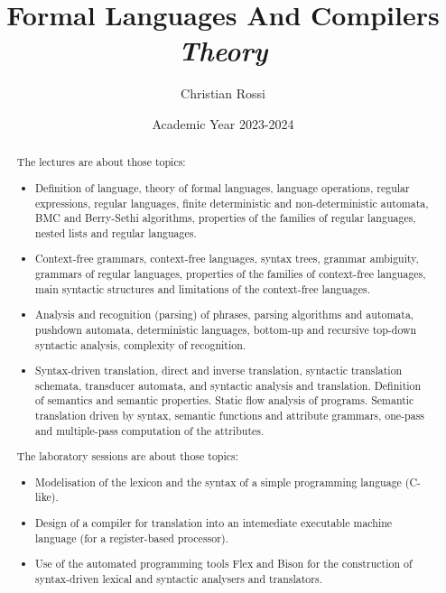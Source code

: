 \documentclass[12pt, a4paper]{report}
\title{Formal Languages And Compilers \\ \textit{Theory}}
\author{Christian Rossi}
\date{Academic Year 2023-2024}
\newtheorem[style=M,bodystyle=\normalfont]{theorem}{Theorem}
\newtheorem[style=M,bodystyle=\normalfont]{corollary}{Corollary}
\newtheorem[style=M,bodystyle=\normalfont]{lemma}{Lemma}
\newtheorem[style=M,bodystyle=\normalfont]{definition}{Definition}
\begin{document}
\maketitle

\newpage

\begin{abstract}
    The lectures are about those topics: 
    \begin{itemize}
        \item Definition of language, theory of formal languages, language operations, regular expressions, regular languages, finite deterministic and non-deterministic automata, 
            BMC and Berry-Sethi algorithms, properties of the families of regular languages, nested lists and regular languages.
        \item Context-free grammars, context-free languages, syntax trees, grammar ambiguity, grammars of regular languages, properties of the families of context-free languages, 
            main syntactic structures and limitations of the context-free languages.
        \item Analysis and recognition (parsing) of phrases, parsing algorithms and automata, pushdown automata, deterministic languages, bottom-up and recursive top-down syntactic 
            analysis, complexity of recognition.
        \item Syntax-driven translation, direct and inverse translation, syntactic translation schemata, transducer automata, and syntactic analysis and translation. Definition of 
            semantics and semantic properties. Static flow analysis of programs. Semantic translation driven by syntax, semantic functions and attribute grammars, one-pass and 
            multiple-pass computation of the attributes.
    \end{itemize}
    The laboratory sessions are about those topics: 
    \begin{itemize}
        \item Modelisation of the lexicon and the syntax of a simple programming language (C-like).
        \item Design of a compiler for translation into an intemediate executable machine language (for a register-based processor).
        \item Use of the automated programming tools Flex and Bison for the construction of syntax-driven lexical and syntactic analysers and translators.
    \end{itemize}
\end{abstract}
\end{document}
